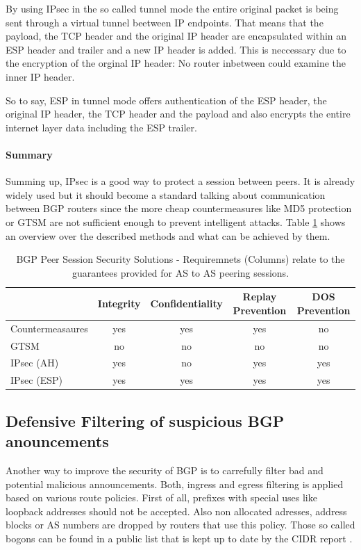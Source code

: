 \documentclass[12pt,a4paper]{IEEEtran}
\begin{document}
		By using IPsec in the so called tunnel mode the entire original packet is being sent through a virtual tunnel beetween IP endpoints. That means that the payload, the TCP header and the original IP header are encapsulated within an ESP header and trailer and a new IP header is added. This is neccessary due to the encryption of the orginal IP header: No router inbetween could examine the inner IP header. 
		
		So to say, ESP in tunnel mode offers authentication of the ESP header, the original IP header, the TCP header and the payload and also encrypts the entire internet layer data including the ESP trailer. 


		\paragraph{Summary} Summing up, IPsec is a good way to protect a session between peers. It is already widely used but it should become a standard talking about  communication between BGP routers since the more cheap countermeasures like MD5 protection or GTSM are not sufficient enough to prevent intelligent attacks. Table \ref{tab:foo} shows an overview over the described methods and what can be achieved by them.

\begin{table}[t]
\centering
\begin{tabular}{ l c c c c }
\toprule
                &  Integrity   &  Confidentiality   &  Replay Prevention & DOS Prevention  \\
\midrule
Countermeasaures  & yes & yes & yes & no \\
GTSM  & no & no & no & no \\
IPsec (AH)  & yes & no & yes & yes \\
IPsec (ESP)  & yes & yes & yes & yes \\
\bottomrule
\end{tabular}
\caption{BGP Peer Session Security Solutions - Requiremnets (Columns) relate to the guarantees provided for AS to AS peering sessions\citep{Butler2010}.}
\label{tab:foo}
\end{table}

       \subsection{Defensive Filtering of suspicious BGP anouncements}

		Another way to improve the security of BGP is to carrefully filter bad and potential malicious announcements.
		Both, ingress and egress filtering is applied based on various route policies.
		First of all, prefixes with special uses like loopback addresses should not be accepted. 
		Also non allocated adresses, address blocks or AS numbers are dropped by routers that use this policy. Those so called bogons can be found in a public list that is kept up to date by the CIDR report \citep{Butler2010}.
\end{document}

